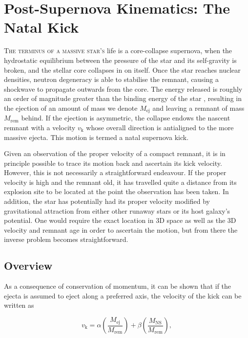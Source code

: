 \chapter{Post-Supernova Kinematics: The Natal Kick}\label{chap:natal_kicks}


\lettrine[lines=3]{T}{he terminus of a massive star's} life is a core-collapse supernova, when the hydrostatic equilibrium between the pressure of the star and its self-gravity is broken, and the stellar core collapses in on itself. Once the star reaches nuclear densities, neutron degeneracy is able to stabilise the remnant, causing a shockwave to propagate outwards from the core. The energy released is roughly an order of magnitude greater than the binding energy of the star \citep{Eldridge:2018}, resulting in the ejection of an amount of mass we denote $M_\text{ej}$ and leaving a remnant of mass $M_\text{rem}$ behind. If the ejection is asymmetric, the collapse endows the nascent remnant with a velocity $v_\text{k}$ whose overall direction is antialigned to the more massive ejecta. This motion is termed a natal supernova kick.

Given an observation of the proper velocity of a compact remnant, it is in principle possible to trace its motion back and ascertain its kick velocity. However, this is not necessarily a straightforward endeavour. If the proper velocity is high and the remnant old, it has travelled quite a distance from its explosion site to be located at the point the observation has been taken. In addition, the star has potentially had its proper velocity modified by gravitational attraction from either other runaway stars or its host galaxy's potential. One would require the exact location in 3D space as well as the 3D velocity and remnant age in order to ascertain the motion, but from there the inverse problem becomes straightforward.

\section{Overview}

As a consequence of conservation of momentum, it can be shown that if the ejecta is assumed to eject along a preferred axis, the velocity of the kick can be written as

\begin{equation}
    v_\text{k} = \alpha\left(\frac{M_\text{ej}}{M_\text{rem}}\right)+\beta\left(\frac{M_\text{NS}}{M_\text{rem}}\right),\label{eq:bray_kick_pure}
\end{equation}

